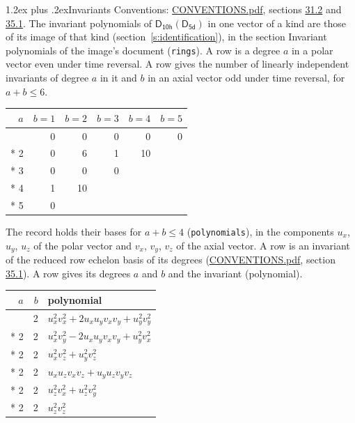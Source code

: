 \documentclass[10pt,a4paper]{article}
\makeatletter
\renewcommand\section{\@startsection{section}{1}{\z@}{-3ex plus -1ex minus -.2ex}%
  {1.2ex plus .2ex}{\normalfont\large\sffamily\bfseries\color{parttitle}}}
\numberwithin{equation}{section}
\newcommand{\grp}[1]{\mathsf{#1}}
\makeatother
\begin{document}
\section{Invariants}\label{s:invariants}
Conventions: \href{../../CONVENTIONS.pdf}{CONVENTIONS.pdf}, sections \href{../../CONVENTIONS.pdf\#conv.31.2}{31.2} and \href{../../CONVENTIONS.pdf\#conv.35.1}{35.1}.
The invariant polynomials of $\grp{D_{10h}}(\grp{D_{5d}})$ in one vector of a kind are those of its image of that kind (section~\ref{s:identification}), in the section Invariant polynomials of the image's document (\texttt{rings}).
\leavevmode\label{n:index.degree.polar}\label{n:index.degree.axial}A row is a degree $a$ in a polar vector even under time reversal. A row gives the number of linearly independent invariants of degree $a$ in it and $b$ in an axial vector odd under time reversal, for $a + b \le 6$.
{\small\begin{longtable}{@{}rrrrrr@{}}\toprule
$a$ & $b = 1$ & $b = 2$ & $b = 3$ & $b = 4$ & $b = 5$\\\midrule\endhead
\bottomrule\endfoot\endlastfoot
1 & 0 & 0 & 0 & 0 & 0\\*
2 & 0 & 6 & 1 & 10 & \\*
3 & 0 & 0 & 0 &  & \\*
4 & 1 & 10 &  &  & \\*
5 & 0 &  &  &  & \\
\bottomrule\end{longtable}}
\leavevmode\label{n:local.component.polar}\label{n:local.component.axial}The record holds their bases for $a + b \le 4$ (\texttt{polynomials}), in the components $u_{x}$, $u_{y}$, $u_{z}$ of the polar vector and $v_{x}$, $v_{y}$, $v_{z}$ of the axial vector. \label{n:head.polynomial}A row is an invariant of the reduced row echelon basis of its degrees (\href{../../CONVENTIONS.pdf}{CONVENTIONS.pdf}, section \href{../../CONVENTIONS.pdf\#conv.35.1}{35.1}). A row gives its degrees $a$ and $b$ and the invariant (polynomial).
{\small\renewcommand{\arraystretch}{1.2}\begin{longtable}{@{}rrl@{}}\toprule
$a$ & $b$ & polynomial\\\midrule\endhead
\bottomrule\endfoot\endlastfoot
2 & 2 & $u_{x}^{2}v_{x}^{2} + 2u_{x}u_{y}v_{x}v_{y} + u_{y}^{2}v_{y}^{2}$\\*
2 & 2 & $u_{x}^{2}v_{y}^{2} - 2u_{x}u_{y}v_{x}v_{y} + u_{y}^{2}v_{x}^{2}$\\*
2 & 2 & $u_{x}^{2}v_{z}^{2} + u_{y}^{2}v_{z}^{2}$\\*
2 & 2 & $u_{x}u_{z}v_{x}v_{z} + u_{y}u_{z}v_{y}v_{z}$\\*
2 & 2 & $u_{z}^{2}v_{x}^{2} + u_{z}^{2}v_{y}^{2}$\\*
2 & 2 & $u_{z}^{2}v_{z}^{2}$\\
\bottomrule\end{longtable}}
\end{document}
